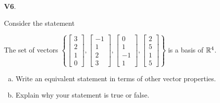 \documentclass{article}
\newenvironment{problem}[1]
{
  \begin{flushleft}
  \textbf{#1}.
  \ignorespaces
}
{
  \end{flushleft}
}
\begin{document}
\begin{problem}{V6}
Consider the statement

\begin{center}\begin{minipage}{0.8\textwidth}
The set of vectors \( \left\{
 \begin{bmatrix} 3 \\ 2 \\ 1 \\ 0 \end{bmatrix} ,
 \begin{bmatrix} -1 \\ 1 \\ 2 \\ 3 \end{bmatrix} ,
 \begin{bmatrix} 0 \\ 1 \\ -1 \\ 1 \end{bmatrix} ,
 \begin{bmatrix} 2 \\ 5 \\ 1 \\ 5 \end{bmatrix} \right\} \)
is a basis of \(\mathbb{R}^4\).
\end{minipage}\end{center}
\begin{enumerate}[(a)]
\item Write an equivalent statement in terms of other vector properties.
\item Explain why your statement is true or false.
\end{enumerate}
\end{problem}
\end{document}
